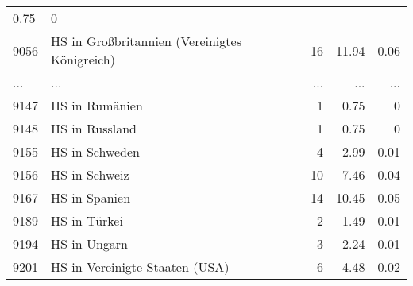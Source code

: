 \begin{longtable}{lXrrr}
          \num[round-mode=places,round-precision=2]{0.75} &
          \num[round-mode=places,round-precision=2]{0} \\
        9056 & \multicolumn{1}{X}{HS in Großbritannien (Vereinigtes Königreich)} & %
          \num{16} &
          \num[round-mode=places,round-precision=2]{11.94} &
          \num[round-mode=places,round-precision=2]{0.06} \\
       ... & ... & ... & ... & ... \\
        9147 & \multicolumn{1}{X}{HS in Rumänien} & %
          \num{1} &
          \num[round-mode=places,round-precision=2]{0.75} &
          \num[round-mode=places,round-precision=2]{0} \\

        9148 & \multicolumn{1}{X}{HS in Russland} & %
          \num{1} &
          \num[round-mode=places,round-precision=2]{0.75} &
          \num[round-mode=places,round-precision=2]{0} \\

        9155 & \multicolumn{1}{X}{HS in Schweden} & %
          \num{4} &
          \num[round-mode=places,round-precision=2]{2.99} &
          \num[round-mode=places,round-precision=2]{0.01} \\

        9156 & \multicolumn{1}{X}{HS in Schweiz} & %
          \num{10} &
          \num[round-mode=places,round-precision=2]{7.46} &
          \num[round-mode=places,round-precision=2]{0.04} \\

        9167 & \multicolumn{1}{X}{HS in Spanien} & %
          \num{14} &
          \num[round-mode=places,round-precision=2]{10.45} &
          \num[round-mode=places,round-precision=2]{0.05} \\

        9189 & \multicolumn{1}{X}{HS in Türkei} & %
          \num{2} &
          \num[round-mode=places,round-precision=2]{1.49} &
          \num[round-mode=places,round-precision=2]{0.01} \\

        9194 & \multicolumn{1}{X}{HS in Ungarn} & %
          \num{3} &
          \num[round-mode=places,round-precision=2]{2.24} &
          \num[round-mode=places,round-precision=2]{0.01} \\

        9201 & \multicolumn{1}{X}{HS in Vereinigte Staaten (USA)} & %
          \num{6} &
          \num[round-mode=places,round-precision=2]{4.48} &
          \num[round-mode=places,round-precision=2]{0.02} \\


\end{longtable}
